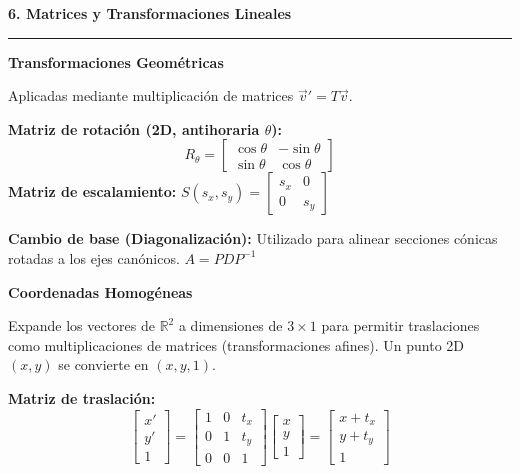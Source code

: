 \documentclass[10pt, landscape, twocolumn]{article}
\newcommand{\cheatsheetsection}[1]{
    \vspace{0.6em}
    {\color{themeblue}\large\bfseries #1} \par
    \vspace{-0.5em}
    {\color{themeblue}\rule{\linewidth}{1pt}} \par
    \vspace{0.2em}
}
\newcommand{\cheatsheetsubsection}[1]{
    \vspace{0.4em}
    {\color{themeblue}\normalsize\bfseries #1} \par
    \vspace{0.1em}
}
\begin{document}
\newpage
\cheatsheetsection{6. Matrices y Transformaciones Lineales}

\cheatsheetsubsection{Transformaciones Geométricas}
Aplicadas mediante multiplicación de matrices $\vec{v}' = T \vec{v}$.

\vspace{-0.5em}
\begin{center}
\end{center}
\vspace{-0.5em}

\textbf{Matriz de rotación (2D, antihoraria $\theta$):}
\[ R_\theta = \begin{bmatrix} \cos\theta & -\sin\theta \\ \sin\theta & \cos\theta \end{bmatrix} \]
\textbf{Matriz de escalamiento:} $S(s_x, s_y) = \begin{bmatrix} s_x & 0 \\ 0 & s_y \end{bmatrix}$

\textbf{Cambio de base (Diagonalización):}
Utilizado para alinear secciones cónicas rotadas a los ejes canónicos. $A = PDP^{-1}$

\cheatsheetsubsection{Coordenadas Homogéneas}
Expande los vectores de $\mathbb{R}^2$ a dimensiones de $3 \times 1$ para permitir traslaciones como multiplicaciones de matrices (transformaciones afines). Un punto 2D $(x,y)$ se convierte en $(x, y, 1)$.

\textbf{Matriz de traslación:}
\[ \begin{bmatrix} x' \\ y' \\ 1 \end{bmatrix} = \begin{bmatrix} 1 & 0 & t_x \\ 0 & 1 & t_y \\ 0 & 0 & 1 \end{bmatrix} \begin{bmatrix} x \\ y \\ 1 \end{bmatrix} = \begin{bmatrix} x + t_x \\ y + t_y \\ 1 \end{bmatrix} \]
\end{document}
